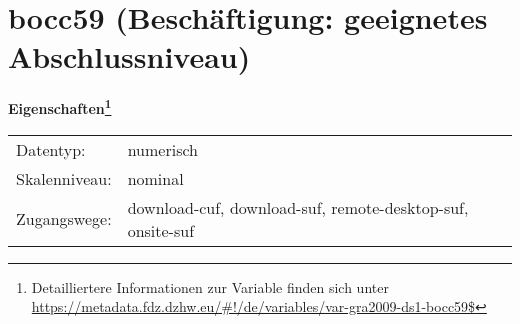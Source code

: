 
    \setcounter{footnote}{0}

    \vspace*{-1.8cm}
	\section{bocc59 (Beschäftigung: geeignetes Abschlussniveau)}
	\label{section:bocc59}



    \vspace*{0.5cm}
    \noindent\textbf{Eigenschaften\footnote{Detailliertere Informationen zur Variable finden sich unter
		\url{https://metadata.fdz.dzhw.eu/\#!/de/variables/var-gra2009-ds1-bocc59$}}}\\
	\begin{tabularx}{\hsize}{@{}lX}
	Datentyp: & numerisch \\
	Skalenniveau: & nominal \\
	Zugangswege: &
	  download-cuf, 
	  download-suf, 
	  remote-desktop-suf, 
	  onsite-suf
 \\
    \end{tabularx}




